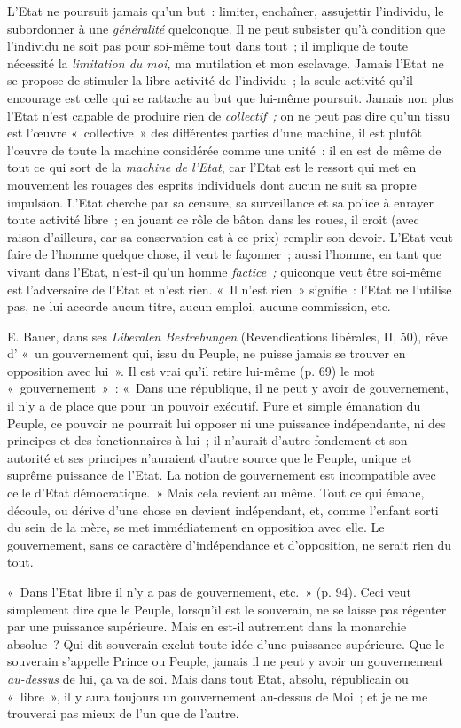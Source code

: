 \documentclass[french,twoside]{book} %
\begin{document}
L’Etat ne poursuit jamais qu’un but : limiter, enchaîner, assujettir l’individu, le subordonner à une \emph{généralité} quelconque. Il ne peut subsister qu’à condition que l’individu ne soit pas pour soi-même tout dans tout ; il implique de toute nécessité la \emph{limitation du moi,} ma mutilation et mon esclavage. Jamais l’Etat ne se propose de stimuler la libre activité de l’individu ; la seule activité qu’il encourage est celle qui se rattache au but que lui-même poursuit. Jamais non plus l’Etat n’est capable de produire rien de \emph{collectif ; }on ne peut pas dire qu’un tissu est l’œuvre « collective » des différentes parties d’une machine, il est plutôt l’œuvre de toute la machine considérée comme une unité : il en est de même de tout ce qui sort de la \emph{machine de l’Etat}, car l’Etat est le ressort qui met en mouvement les rouages des esprits individuels dont aucun ne suit sa propre impulsion. L’Etat cherche par sa censure, sa surveillance et  sa police à enrayer toute activité libre ; en jouant ce rôle de bâton dans les roues, il croit (avec raison d’ailleurs, car sa conservation est à ce prix) remplir son devoir. L’Etat veut faire de l’homme quelque chose, il veut le façonner ; aussi l’homme, en tant que vivant dans l’Etat, n’est-il qu’un homme \emph{factice ;} quiconque veut être soi-même est l’adversaire de l’Etat et n’est rien. « Il n’est rien » signifie : l’Etat ne l’utilise pas, ne lui accorde aucun titre, aucun emploi, aucune commission, etc.\par
E. Bauer, dans ses \emph{Liberalen Bestrebungen} (Revendications libérales, II, 50), rêve d’ « un gouvernement qui, issu du Peuple, ne puisse jamais se trouver en opposition avec lui ». Il est vrai qu’il retire lui-même (p. 69) le mot « gouvernement » : « Dans une république, il ne peut y avoir de gouvernement, il n’y a de place que pour un pouvoir exécutif. Pure et simple émanation du Peuple, ce pouvoir ne pourrait lui opposer ni une puissance indépendante, ni des principes et des fonctionnaires à lui ; il n’aurait d’autre fondement et son autorité et ses principes n’auraient d’autre source que le Peuple, unique et suprême puissance de l’Etat. La notion de gouvernement est incompatible avec celle d’Etat démocratique. » Mais cela revient au même. Tout ce qui émane, découle, ou dérive d’une chose en devient indépendant, et, comme l’enfant sorti du sein de la mère, se met immédiatement en opposition avec elle. Le gouvernement, sans ce caractère d’indépendance et d’opposition, ne serait rien du tout.\par
« Dans l’Etat libre il n’y a pas de gouvernement, etc. » (p. 94). Ceci veut simplement dire que le Peuple, lorsqu’il est le souverain, ne se laisse pas régenter par une puissance supérieure. Mais en est-il autrement dans la monarchie absolue ? Qui dit souverain exclut toute idée d’une puissance supérieure. Que le souverain s’appelle Prince ou Peuple, jamais il ne peut y avoir un gouvernement \emph{au-dessus} de lui, ça va de soi. Mais  dans tout Etat, absolu, républicain ou « libre », il y aura toujours un gouvernement au-dessus de Moi ; et je ne me trouverai pas mieux de l’un que de l’autre.\par
\end{document}
